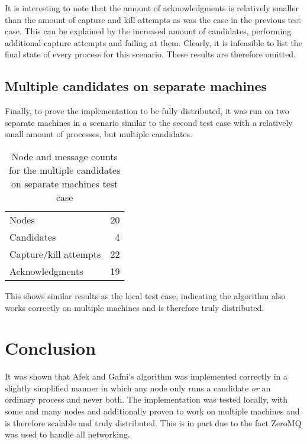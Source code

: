 \documentclass{article}
\begin{document}
It is interesting to note that the amount of acknowledgments is relatively smaller than the amount of capture and kill attempts as was the case in the previous test case. This can be explained by the increased amount of candidates, performing additional capture attempts and failing at them. Clearly, it is infeasible to list the final state of every process for this scenario. These results are therefore omitted.

\subsection{Multiple candidates on separate machines}
Finally, to prove the implementation to be fully distributed, it was run on two separate machines in a scenario similar to the second test case with a relatively small amount of processes, but multiple candidates.

\begin{table}[H]
	\centering
	\caption{Node and message counts for the multiple candidates on separate machines test case}
	\begin{tabular}{l r}
		\toprule
		Nodes 					& 20	\\
		Candidates 				& 4 	\\
		Capture/kill attempts 	& 22	\\
		Acknowledgments 		& 19	\\
		\bottomrule
	\end{tabular}
	\label{tab:counts-separate}
\end{table}

This shows similar results as the local test case, indicating the algorithm also works correctly on multiple machines and is therefore truly distributed.

\section{Conclusion}
It was shown that Afek and Gafni's algorithm was implemented correctly in a slightly simplified manner in which any node only runs a candidate \emph{or} an ordinary process and never both. The implementation was tested locally, with some and many nodes and additionally proven to work on multiple machines and is therefore scalable and truly distributed. This is in part due to the fact ZeroMQ was used to handle all networking.

\printbibliography
\end{document}
